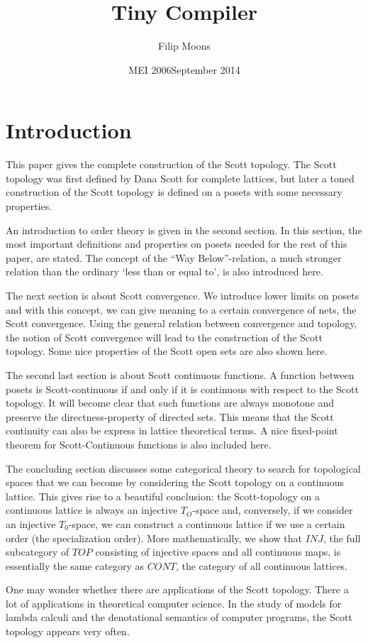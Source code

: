 \documentclass[a4paper,12pt]{article}
\author{Filip Moons}
\title{Tiny Compiler}
\date{MEI 2006}
\date{September 2014}
\begin{document}
\maketitlepage


\tableofcontents
\newpage
\section{Introduction}
This paper gives the complete construction of the Scott topology. The Scott topology was first defined by Dana Scott for complete lattices, but later a toned construction of the Scott topology is defined on a posets with some necessary properties.

An introduction to order theory is given in the second section. In this section, the most  important definitions and properties on posets needed for the rest of this paper, are stated. The concept of the ``Way Below''-relation, a much stronger relation than the ordinary `less than or equal to', is also introduced here. 

The next section is about Scott convergence. We introduce lower limits on posets and with this concept, we can give meaning to a certain convergence of nets, the Scott convergence. Using the general relation between convergence and topology, the notion of Scott convergence will lead to the construction of the Scott topology. Some nice properties of the Scott open sets are also shown here.

The second last section is about Scott continuous functions. A function between posets is Scott-continuous if and only if it is continuous with respect to the Scott topology. It will become clear that such functions are always monotone and preserve the directness-property of directed sets. This means that the Scott continuity can also be express in lattice theoretical terms. A nice fixed-point theorem for Scott-Continuous functions is also included here.

The concluding section discusses some categorical theory to search for topological spaces that we can become by considering the Scott topology on a continuous lattice. This gives rise to a beautiful conclusion: the Scott-topology on a continuous lattice is always an injective $T_O$-space and, conversely, if we consider an injective $T_0$-space, we can construct a continuous lattice if we use a certain order (the specialization order). More mathematically, we show that $INJ$, the full subcategory of $TOP$ consisting of injective spaces and all continuous maps, is essentially the same category as $CONT$, the category of all continuous lattices.

One may wonder whether there are applications of the Scott topology. There a lot of applications in theoretical computer science. In the study of models for lambda calculi and the denotational semantics of computer programs, the Scott topology appears very often.
\end{document}
